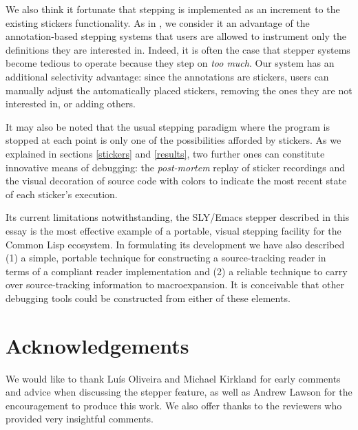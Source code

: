 \documentclass[sigconf]{acmart}
\begin{document}
We also think it fortunate that stepping is implemented as an
increment to the existing stickers functionality.  As in
\cite{annotation-based}, we consider it an advantage of the
annotation-based stepping systems that users are allowed to instrument
only the definitions they are interested in.  Indeed, it is often the
case that stepper systems become tedious to operate because they step
on \emph{too much}.  Our system has an additional selectivity
advantage: since the annotations are stickers, users can manually
adjust the automatically placed stickers, removing the ones they are
not interested in, or adding others.

It may also be noted that the usual stepping paradigm where the
program is stopped at each point is only one of the possibilities
afforded by stickers.  As we explained in sections \ref{stickers} and
\ref{results}, two further ones can constitute innovative means of
debugging: the \emph{post-mortem} replay of sticker recordings and the
visual decoration of source code with colors to indicate the most
recent state of each sticker's execution.

Its current limitations notwithstanding, the SLY/Emacs stepper
described in this essay is the most effective example of a portable,
visual stepping facility for the Common Lisp ecosystem.  In
formulating its development we have also described (1) a simple,
portable technique for constructing a source-tracking reader in terms
of a compliant reader implementation and (2) a reliable technique to
carry over source-tracking information to macroexpansion.  It is
conceivable that other debugging tools could be constructed from
either of these elements.

\section{Acknowledgements}

We would like to thank Luís Oliveira and Michael Kirkland for early
comments and advice when discussing the stepper feature, as well as
Andrew Lawson for the encouragement to produce this work.  We also
offer thanks to the reviewers who provided very insightful comments.




\end{document}
